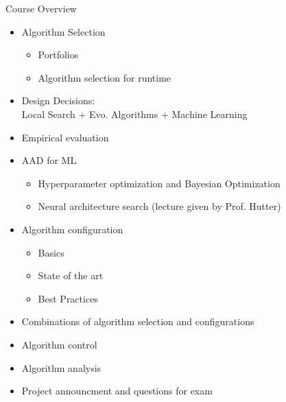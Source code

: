 \begin{frame}[c]{Course Overview}

\begin{itemize}
\item Algorithm Selection
  \begin{itemize}
    \item Portfolios
    \item Algorithm selection for runtime
  \end{itemize}
  \item Design Decisions:\\ Local Search + Evo. Algorithms + Machine Learning 
  \item Empirical evaluation
  \item AAD for ML
  \begin{itemize}
    \item Hyperparameter optimization and Bayesian Optimization 
    \item Neural architecture search (lecture given by Prof. Hutter)
  \end{itemize}
  \item Algorithm configuration 
  \begin{itemize}
    \item Basics 
    \item State of the art 
    \item Best Practices 
  \end{itemize}
  \item Combinations of algorithm selection and configurations
  \item Algorithm control 
  \item Algorithm analysis 
  \item Project announcment and questions for exam 
\end{itemize}

\end{frame}
% 
